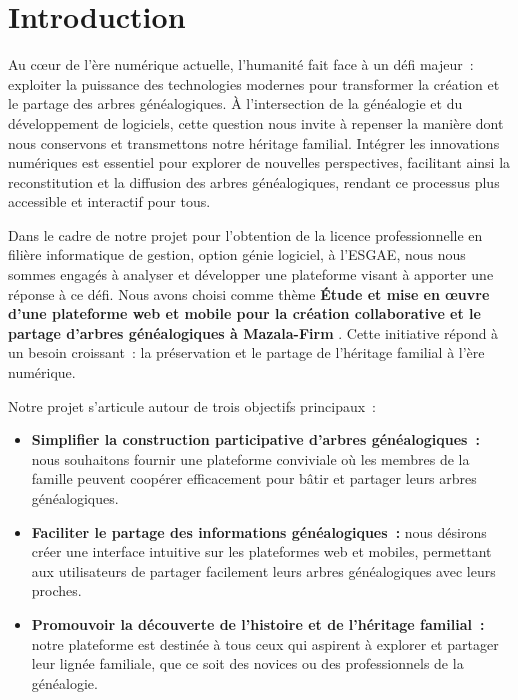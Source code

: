 \chapter*{Introduction}
\label{chap:introduction}
Au cœur de l’ère numérique actuelle, l’humanité fait face à un défi majeur :
exploiter la puissance des technologies modernes pour transformer la création
et le partage des arbres généalogiques. À l’intersection de la généalogie et
du développement de logiciels, cette question nous invite à repenser la
manière dont nous conservons et transmettons notre héritage familial.
Intégrer les innovations numériques est essentiel pour explorer de nouvelles
perspectives, facilitant ainsi la reconstitution et la diffusion des arbres
généalogiques, rendant ce processus plus accessible et interactif pour tous.

Dans le cadre de notre projet pour l’obtention de la licence professionnelle en
filière informatique de gestion, option génie logiciel, à l’\ac{ESGAE}, nous nous
sommes engagés à analyser et développer une plateforme visant à apporter une
réponse à ce défi. Nous avons choisi comme thème
\textbf {\og Étude et mise en œuvre d’une plateforme web et mobile pour la création collaborative et le partage d’arbres généalogiques à Mazala-Firm \fg}. Cette initiative répond à un besoin croissant : la préservation et le partage de l’héritage
familial à l’ère numérique.

Notre projet s’articule autour de trois objectifs principaux :
\begin{itemize}
  \item \textbf{Simplifier la construction participative d’arbres généalogiques :}
    nous souhaitons fournir une plateforme conviviale où les membres de
    la famille peuvent coopérer efficacement pour bâtir et partager leurs
    arbres généalogiques.

  \item \textbf{Faciliter le partage des informations généalogiques :} nous désirons
    créer une interface intuitive sur les plateformes web et mobiles,
    permettant aux utilisateurs de partager facilement leurs arbres
    généalogiques avec leurs proches.

  \item \textbf{Promouvoir la découverte de l’histoire et de l’héritage familial :}
    notre plateforme est destinée à tous ceux qui aspirent à explorer et
    partager leur lignée familiale, que ce soit des novices ou des
    professionnels de la généalogie.
\end{itemize}

